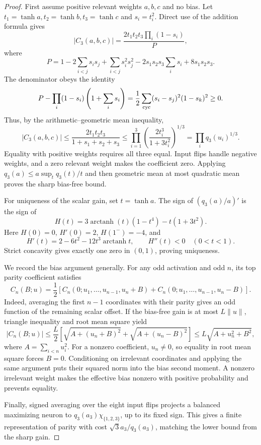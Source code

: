 \documentclass[11pt]{article}
\theoremstyle{remark}\newtheorem{remark}[theorem]{Remark}
\begin{document}
\begin{proof}
First assume positive relevant weights $a,b,c$ and no bias. Let
$t_1=\tanh a,t_2=\tanh b,t_3=\tanh c$ and $s_i=t_i^2$. Direct use of
the addition formula gives
\[
 |C_3(a,b,c)|=\frac{2t_1t_2t_3\prod_i(1-s_i)}P,
\]
where
\[
 P=1-2\sum_{i<j}s_is_j+\sum_{i<j}s_i^2s_j^2
        -2s_1s_2s_3\sum_i s_i+8s_1s_2s_3.
\]
The denominator obeys the identity
\[
 P-\prod_i(1-s_i)\left(1+\sum_i s_i\right)
 =\frac12\sum_{\rm cyc}(s_i-s_j)^2(1-s_k)^2\ge0.
\]
Thus, by the arithmetic--geometric mean inequality,
\begin{equation}\label{eq:holder3}
 |C_3(a,b,c)|
 \le\frac{2t_1t_2t_3}{1+s_1+s_2+s_3}
 \le\prod_{i=1}^3\left(\frac{2t_i^3}{1+3t_i^2}\right)^{1/3}
 =\prod_i q_3(u_i)^{1/3}.
\end{equation}
Equality with positive weights requires all three equal. Input flips
handle negative weights, and a zero relevant weight makes the
coefficient zero. Applying $q_3(a)\le a\sup_t q_3(t)/t$ and then
geometric mean at most quadratic mean proves the sharp bias-free bound.

For uniqueness of the scalar gain, set $t=\tanh a$. The sign of
$(q_3(a)/a)'$ is the sign of
\[
 H(t)=3\operatorname{arctanh}(t)(1-t^4)-t(1+3t^2).
\]
Here $H(0)=0$, $H'(0)=2$, $H(1^-)=-4$, and
\[
 H'(t)=2-6t^2-12t^3\operatorname{arctanh}t,\qquad H''(t)<0
 \quad(0<t<1).
\]
Strict concavity gives exactly one zero in $(0,1)$, proving uniqueness.

We record the bias argument generally. For any odd activation and odd
$n$, its top parity coefficient satisfies
\begin{equation}\label{eq:bias-identity}
 C_n(B;u)=\frac12\left[
 C_n(0;u_1,\ldots,u_{n-1},u_n+B)
 +C_n(0;u_1,\ldots,u_{n-1},u_n-B)\right].
\end{equation}
Indeed, averaging the first $n-1$ coordinates with their parity gives
an odd function of the remaining scalar offset. If the bias-free gain
is at most $L\|u\|$, triangle inequality and root mean square yield
\[
 |C_n(B;u)|\le\frac L2\left[
 \sqrt{A+(u_n+B)^2}+\sqrt{A+(u_n-B)^2}\right]
 \le L\sqrt{A+u_n^2+B^2},
\]
where $A=\sum_{i<n}u_i^2$. For a nonzero coefficient, $u_n\ne0$,
so equality in root mean square forces $B=0$. Conditioning on irrelevant
coordinates and applying the same argument puts their squared norm
into the bias second moment. A nonzero irrelevant weight makes the
effective bias nonzero with positive probability and prevents equality.

Finally, signed averaging over the eight input flips projects a balanced
maximizing neuron to $q_3(a_3)\chi_{\{1,2,3\}}$, up to its fixed sign.
This gives a finite representation of parity with cost
$\sqrt3a_3/q_3(a_3)$, matching the lower bound from the sharp gain.
\end{proof}
\end{document}
